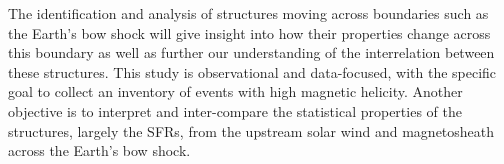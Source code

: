 The identification and analysis of structures moving across boundaries such as the Earth's bow shock will give insight into how their properties change across this boundary as well as further our understanding of the interrelation between these structures. This study is observational and data-focused, with the specific goal to collect an inventory of events with high magnetic helicity. Another objective is to interpret and inter-compare the statistical properties of the structures, largely the SFRs, from the upstream solar wind and magnetosheath across the Earth's bow shock.
